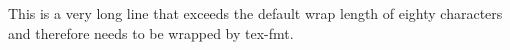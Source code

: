 
This is a very long line that exceeds the default wrap length of
eighty characters and therefore needs to be wrapped by tex-fmt.

